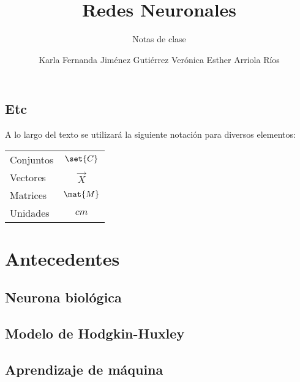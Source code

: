 \documentclass[12pt,openany]{book}
\title{Redes Neuronales}
\subtitle{Notas de clase}
\author{Karla Fernanda Jiménez Gutiérrez\newline
        Verónica Esther Arriola Ríos}
\begin{document}
\maketitle

\frontmatter %
\tableofcontents
\clearemptydoublepage %


\mainmatter  %


\chapter*{Etc}

A lo largo del texto se utilizará la siguiente notación para diversos elementos:
\begin{longtable}{lc}
 Conjuntos   &   $\set{C}$ \\
 Vectores    &   $\vec{X}$ \\
 Matrices    &   $\mat{M}$ \\
 Unidades    &   $\unit{cm}$
\end{longtable}



\part{Antecedentes}
\chapter{Neurona biológica}

 


\chapter{Modelo de Hodgkin-Huxley}


\chapter{Aprendizaje de máquina}



\end{document}
